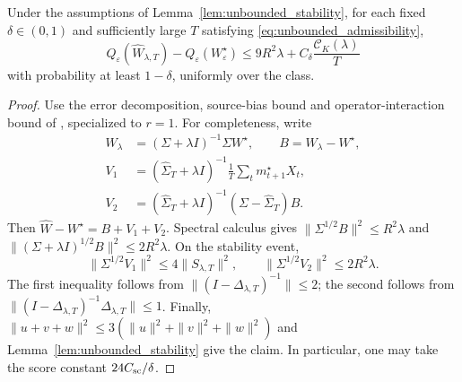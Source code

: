 \begin{corollary}
\label{cor:unbounded_risk}
Under the assumptions of Lemma~\ref{lem:unbounded_stability}, for each fixed
$\delta\in(0,1)$ and sufficiently large $T$ satisfying
\eqref{eq:unbounded_admissibility},
\[
Q_\varepsilon(\widehat W_{\lambda,T})-Q_\varepsilon(W^\star_\varepsilon)
\leq9R^2\lambda+C_\delta\frac{\mathcal C_K(\lambda)}{T}
\]
with probability at least $1-\delta$, uniformly over the class.
\end{corollary}
\begin{proof}
Use the error decomposition, source-bias bound and operator-interaction
bound of \citet{bignozzigagliardinischneider2026}, specialized to $r=1$.
For completeness, write
\[
\begin{split}
W_\lambda&=(\Sigma+\lambda I)^{-1}\Sigma W^\star,\qquad B=W_\lambda-W^\star,\\
V_1&=(\widehat\Sigma_T+\lambda I)^{-1}
          \frac1T\sum_t m^\star_{t+1}X_t,\\
V_2&=(\widehat\Sigma_T+\lambda I)^{-1}(\Sigma-\widehat\Sigma_T)B.
\end{split}
\]
Then $\widehat W-W^\star=B+V_1+V_2$.
Spectral calculus gives $\|\Sigma^{1/2}B\|^2\leq R^2\lambda$ and
$\|(\Sigma+\lambda I)^{1/2}B\|^2\leq2R^2\lambda$.
On the stability event,
\[
\|\Sigma^{1/2}V_1\|^2\leq4\|S_{\lambda,T}\|^2,
\qquad
\|\Sigma^{1/2}V_2\|^2\leq2R^2\lambda.
\]
The first inequality follows from $\|(I-\Delta_{\lambda,T})^{-1}\|\leq2$;
the second follows from
$\|(I-\Delta_{\lambda,T})^{-1}\Delta_{\lambda,T}\|\leq1$.
Finally, $\|u+v+w\|^2\leq3(\|u\|^2+\|v\|^2+\|w\|^2)$
and Lemma~\ref{lem:unbounded_stability} give the claim. In particular,
one may take the score constant $24C_{\rm sc}/\delta$.
\end{proof}
